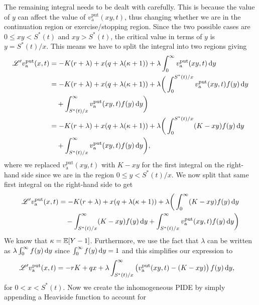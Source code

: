     The remaining integral needs to be dealt with carefully. This is because the value of $y$ can affect the value of $v_{\text{a}}^{\text{put}}(xy,t)$, thus changing whether we are in the continuation region or exercise/stopping region.
    Since the two possible cases are $0 \leq xy < S^*(t)$ and $xy > S^*(t)$, the critical value in terms of $y$ is $y = S^*(t)/x$. This means we have to split the integral into two regions giving
        \begin{align*}
            \mathscr L'v_{\text{a}}^{\text{put}}(x,t) &= -K(r+\lambda) + x(q + \lambda(\kappa+1)) + \lambda\int_0^\infty v_{\text{a}}^{\text{put}}(xy,t) \, \mathrm d y \\
            &= -K(r+\lambda) + x(q+\lambda(\kappa+1)) + \lambda\bigg( \int_0^{S^*(t)/x} v_{\text{a}}^{\text{put}}(xy,t)f(y) \, \mathrm d y \\
            &{} \quad + \int_{S^*(t)/x}^\infty v_{\text{a}}^{\text{put}}(xy,t)f(y) \, \mathrm d y \bigg) \\
            &= -K(r+\lambda) + x(q+\lambda(\kappa+1)) + \lambda\bigg( \int_0^{S^*(t)/x} (K - xy)f(y) \, \mathrm d y \\
            &{} \quad+ \int_{S^*(t)/x}^\infty v_{\text{a}}^{\text{put}}(xy,t)f(y) \, \mathrm d y \bigg),
        \end{align*}
    where we replaced $v_{\text{a}}^{\text{put}}(xy,t)$ with $K-xy$  for the first integral on the right-hand side since we are in the region $0 \leq y < S^*(t)/x$.
    We now split that same first integral on the right-hand side to get
        \begin{align*}
            \mathscr L'v_{\text{a}}^{\text{put}}(x,t) &= -K(r+\lambda) + x(q+\lambda(\kappa+1)) + \lambda\bigg( \int_0^\infty (K-xy)f(y) \, \mathrm d y  \\
            &\quad - \int_{S^*(t)/x}^\infty (K-xy)f(y) \, \mathrm d y + \int_{S^*(t)/x}^\infty v_{\text{a}}^{\text{put}}(xy,t)f(y) \, \mathrm d y \bigg)
        \end{align*}
  We know that $\kappa = \mathbb E[Y-1]$. Furthermore, we use the fact that
    $\lambda$ can be written as $\lambda\int_0^\infty f(y) \, \mathrm d y$ since $\int_0^\infty f(y) \, \mathrm d y=1$ and this simplifies our expression to
      \begin{align*}
          \mathscr L'v_{\text{a}}^{\text{put}}(x,t) &= -rK + qx + \lambda \int_{S^*(t)/x}^\infty \left(v_{\text{a}}^{\text{put}}(xy,t) - (K-xy)\right)f(y) \,\mathrm d y,
      \end{align*}
    for $0 < x < S^*(t)$. Now we create the inhomogeneous PIDE by simply appending a Heaviside function to account for
